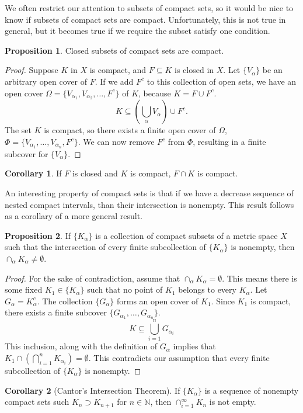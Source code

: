 \documentclass{article}
\newcommand{\N}{\mathbb{N}}
\theoremstyle{definition}
\newtheorem{proposition}{Proposition}[section]
\newtheorem{corollary}{Corollary}[section]
\begin{document}
	We often restrict our attention to subsets of compact sets, so it would be nice to know if subsets of compact sets are compact. Unfortunately, this is not true in general, but it becomes true if we require the subset satisfy one condition. 
	\begin{proposition}
		Closed subsets of compact sets are compact.
	\end{proposition}
	\begin{proof}
		Suppose $ K $ in $ X $ is compact, and $ F\subseteq K $ is closed in $ X $. Let $ \{V_\alpha\} $ be an arbitrary open cover of $ F $. If we add $ F^c $ to this collection of open sets, we have an open cover $ \Omega=\{V_{\alpha_1},V_{\alpha_2},\ldots,F^c\} $ of $ K $, because $ K=F\cup F^c $. $$ K\subseteq\left(\bigcup_\alpha V_\alpha\right)\cup F^c.$$ The set $ K $ is compact, so there exists a finite open cover of $ \Omega $, $ \Phi=\{V_{\alpha_1},\ldots,V_{\alpha_n}, F^c\} $. We can now remove $ F^c $ from $ \Phi $, resulting in a finite subcover for $ \{V_\alpha\} $. 
	\end{proof}
	\begin{corollary}
		If $ F $ is closed and $ K $ is compact, $ F\cap K $ is compact. 
	\end{corollary}
	An interesting property of compact sets is that if we have a decrease sequence of nested compact intervals, than their intersection is nonempty. This result follows as a corollary of a more general result.
	\begin{proposition}
		If $ \{K_\alpha\} $ is a collection of compact subsets of a metric space $ X $ such that the intersection of every finite subcollection of $ \{K_\alpha\} $ is nonempty, then $ \cap_\alpha K_\alpha\neq\emptyset $. 
	\end{proposition}
	\begin{proof}
		For the sake of contradiction, assume that $ \cap_\alpha K_\alpha=\emptyset $. This means there is some fixed $K_1\in \{K_\alpha\}$ such that no point of $ K_1 $ belongs to every $ K_\alpha $. Let $ G_\alpha= K_\alpha^c $. The collection $ \{G_\alpha\} $ forms an open cover of $ K_1$. Since $ K_1 $ is compact, there exists a finite subcover $ \{G_{\alpha_1},\ldots,G_{\alpha_n}\} $. $$ K\subseteq\bigcup_{i=1}^nG_{\alpha_i}$$ This inclusion, along with the definition of $ G_\alpha $ implies that $ K_1\cap\left(\bigcap_{i=1}^nK_{\alpha_i}\right)=\emptyset $. This contradicts our assumption that every finite subcollection of $ \{K_\alpha\} $ is nonempty. 
	\end{proof}
	\begin{corollary}[Cantor's Intersection Theorem]
		If $ \{K_\alpha\} $ is a sequence of nonempty compact sets such $ K_{n}\supset K_{n+1} $ for $ n\in\N $, then $ \cap_{i=1}^\infty K_n $ is not empty.
	\end{corollary}
\end{document}
